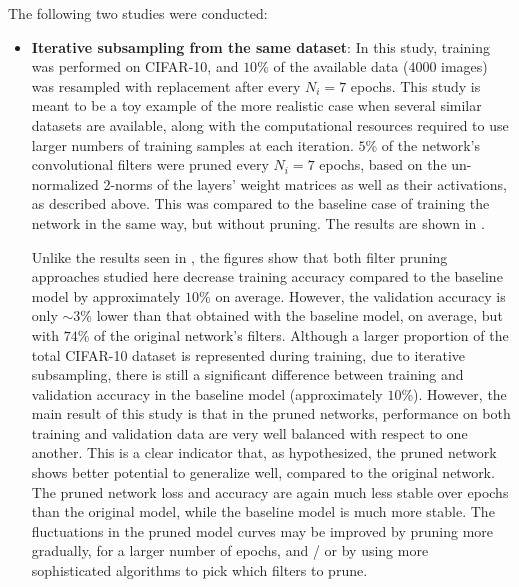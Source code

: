 \documentclass{article}
\begin{document}
The following two studies were conducted:
\begin{itemize}
	\item \textbf{Iterative subsampling from the same dataset}: In this study, training was performed on CIFAR-10, and $10$\% of the available data ($4000$ images) was resampled with replacement after every $N_i = 7$ epochs.
	This study is meant to be a toy example of the more realistic case when several similar datasets are available, along with the computational resources required to use larger numbers of training samples at each iteration.
	$5$\% of the network's convolutional filters were pruned every $N_i = 7$ epochs, based on the un-normalized 2-norms of the layers' weight matrices as well as their activations, as described above. This was compared to the baseline case of training the network in the same way, but without pruning. The results are shown in .
	
	Unlike the results seen in , the figures show that both filter pruning approaches studied here decrease training accuracy compared to the baseline model by approximately $10$\% on average. However, the validation accuracy is only $\sim 3$\% lower than that obtained with the baseline model, on average, but with $74$\% of the original network's filters. Although a larger proportion of the total CIFAR-10 dataset is represented during training, due to iterative subsampling, there is still a significant difference between training and validation accuracy in the baseline model (approximately $10$\%). However, the main result of this study is that in the pruned networks, performance on both training and validation data are very well balanced with respect to one another. This is a clear indicator that, as hypothesized, the pruned network shows better potential to generalize well, compared to the original network. The pruned network loss and accuracy are again much less stable over epochs than the original model, while the baseline model is much more stable. The fluctuations in the pruned model curves may be improved by pruning more gradually, for a larger number of epochs, and / or by using more sophisticated algorithms to pick which filters to prune.


\end{itemize}
\end{document}
